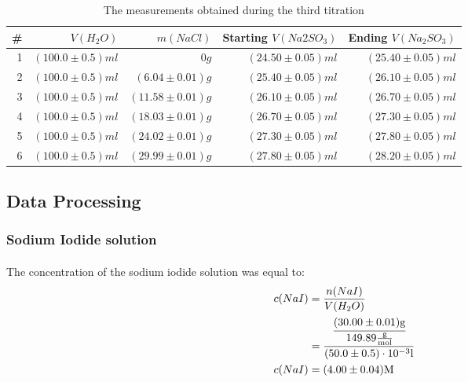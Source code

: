 \documentclass[a4paper]{article}
\begin{document}
\begin{table}[ht]
  \center
  \begin{tabular}{r | r | r | r | r }
    \# & $V(H_2O)$ & $m(NaCl)$ & Starting $V(Na2SO_3)$ & Ending $V(Na_2SO_3)$
    \\ \hline \hline
    1 & $(100.0 \pm 0.5) \si{ml}$ & $0 \si{g}$ & $(24.50 \pm 0.05) \si{ml}$ &
    $(25.40 \pm 0.05) \si{ml}$ \\ \hline
    2 & $(100.0 \pm 0.5) \si{ml}$ & $(6.04 \pm 0.01) \si{g}$ & $(25.40 \pm
    0.05) \si{ml}$ & $(26.10 \pm 0.05) \si{ml}$ \\ \hline
    3 & $(100.0 \pm 0.5) \si{ml}$ & $(11.58 \pm 0.01) \si{g}$ & $(26.10 \pm
    0.05) \si{ml}$ & $(26.70 \pm 0.05) \si{ml}$ \\ \hline
    4 & $(100.0 \pm 0.5) \si{ml}$ & $(18.03 \pm 0.01) \si{g}$ & $(26.70 \pm
    0.05) \si{ml}$ & $(27.30 \pm 0.05) \si{ml}$ \\ \hline
    5 & $(100.0 \pm 0.5) \si{ml}$ & $(24.02 \pm 0.01) \si{g}$ & $(27.30 \pm
    0.05) \si{ml}$ & $(27.80 \pm 0.05) \si{ml}$ \\ \hline
    6 & $(100.0 \pm 0.5) \si{ml}$ & $(29.99 \pm 0.01) \si{g}$ & $(27.80 \pm
    0.05) \si{ml}$ & $(28.20 \pm 0.05) \si{ml}$ \\ \hline
  \end{tabular}
  \caption{The measurements obtained during the third titration
  \label{tbl:titration-3}}
\end{table}

\subsection{Data Processing}

\subsubsection{Sodium Iodide solution}

\paragraph*{}
The concentration of the sodium iodide solution was equal to:
\begin{align*}
  c(NaI) 
  &= \frac{n(NaI)}{V(H_2O)} \\
  &= \cfrac{\cfrac{(30.00 \pm 0.01)\si{g}}{149.89\si{\frac{g}{mol}}}}{(50.0 \pm
    0.5) \cdot 10^{-3} \si{l}} \\
  c(NaI) &= (4.00 \pm 0.04) \si{M}
\end{align*}
\end{document}
